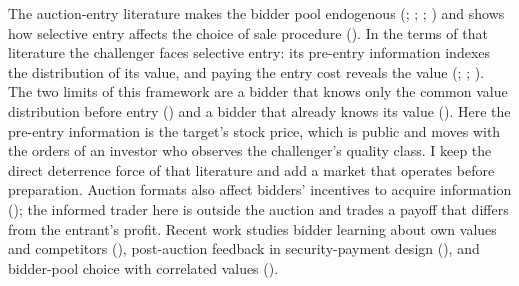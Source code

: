 The auction-entry literature makes the bidder pool endogenous (; ; ; ) and shows how selective entry affects the choice of sale procedure (). In the terms of that literature the challenger faces selective entry: its pre-entry information indexes the distribution of its value, and paying the entry cost reveals the value (; ; ). The two limits of this framework are a bidder that knows only the common value distribution before entry () and a bidder that already knows its value (). Here the pre-entry information is the target's stock price, which is public and moves with the orders of an investor who observes the challenger's quality class. I keep the direct deterrence force of that literature and add a market that operates before preparation. Auction formats also affect bidders' incentives to acquire information (); the informed trader here is outside the auction and trades a payoff that differs from the entrant's profit. Recent work studies bidder learning about own values and competitors (), post-auction feedback in security-payment design (), and bidder-pool choice with correlated values ().
